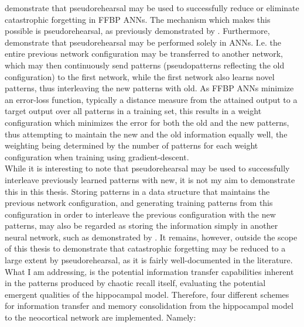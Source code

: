 \cite{Ans1997} demonstrate that pseudorehearsal may be used to successfully reduce or eliminate catastrophic forgetting in FFBP ANNs. The mechanism which makes this possible is pseudorehearsal, as previously demonstrated by \cite{Robins1995}. Furthermore, \cite{Ans1997} demonstrate that pseudorehearsal may be performed solely in ANNs. I.e. the entire previous network configuration may be transferred to another network, which may then continuously send patterns (pseudopatterns reflecting the old configuration) to the first network, while the first network also learns novel patterns, thus interleaving the new patterns with old. As FFBP ANNs minimize an error-loss function, typically a distance measure from the attained output to a target output over all patterns in a training set, this results in a weight configuration which minimizes the error for both the old and the new patterns, thus attempting to maintain the new and the old information equally well, the weighting being determined by the number of patterns for each weight configuration when training using gradient-descent.
\\

While it is interesting to note that pseudorehearsal may be used to successfully interleave previously learned patterns with new, it is not my aim to demonstrate this in this thesis.
Storing patterns in a data structure that maintains the previous network configuration, and generating training patterns from this configuration in order to interleave the previous configuration with the new patterns, may also be regarded as storing the information simply in another neural network, such as demonstrated by \cite{French1997}. It remains, however, outside the scope of this thesis to demonstrate that catastrophic forgetting may be reduced to a large extent by pseudorehearsal, as it is fairly well-documented in the literature. 
What I am addressing, is the potential information transfer capabilities inherent in the patterns produced by chaotic recall itself, evaluating the potential emergent qualities of the hippocampal model. Therefore, four different schemes for information transfer and memory consolidation from the hippocampal model to the neocortical network are implemented. Namely:

